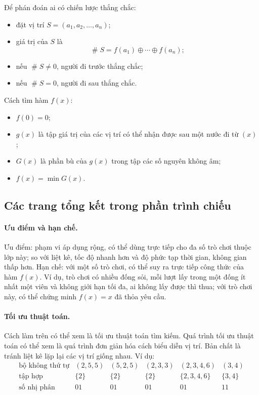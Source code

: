 \documentclass[11pt]{article}
\newcommand{\nimadd}{\oplus}
\newcommand{\val}[1]{\mathop{\#}\!#1}
\begin{document}
Để phán đoán ai có chiến lược thắng chắc:
\begin{itemize}
  \item đặt vị trí \(S=(a_1,a_2,\ldots,a_n)\);
  \item giá trị của \(S\) là
  \[
    \val{S}=f(a_1)\nimadd\cdots\nimadd f(a_n);
  \]
  \item nếu \(\val{S}\ne0\), người đi trước thắng chắc;
  \item nếu \(\val{S}=0\), người đi sau thắng chắc.
\end{itemize}
Cách tìm hàm \(f(x)\):
\begin{itemize}
  \item \(f(0)=0\);
  \item \(g(x)\) là tập giá trị của các vị trí có thể nhận được sau một nước
  đi từ \((x)\);
  \item \(G(x)\) là phần bù của \(g(x)\) trong tập các số nguyên không âm;
  \item \(f(x)=\min G(x)\).
\end{itemize}

\subsection{Các trang tổng kết trong phần trình chiếu}

\paragraph{Ưu điểm và hạn chế.}
Ưu điểm: phạm vi áp dụng rộng, có thể dùng trực tiếp cho đa số trò chơi thuộc
lớp này; so với liệt kê, tốc độ nhanh hơn và độ phức tạp thời gian, không
gian thấp hơn. Hạn chế: với một số trò chơi, có thể suy ra trực tiếp công
thức của hàm \(f(x)\). Ví dụ, trò chơi có nhiều đống sỏi, mỗi lượt lấy trong
một đống ít nhất một viên và không giới hạn tối đa, ai không lấy được thì
thua; với trò chơi này, có thể chứng minh \(f(x)=x\) đã thỏa yêu cầu.

\paragraph{Tối ưu thuật toán.}
Cách làm trên có thể xem là tối ưu thuật toán tìm kiếm. Quá trình tối ưu
thuật toán có thể xem là quá trình đơn giản hóa cách biểu diễn vị trí. Bản
chất là tránh liệt kê lặp lại các vị trí giống nhau. Ví dụ:
\[
\begin{array}{c|ccccc}
\text{bộ không thứ tự}
&(2,5,5)&(5,2,5)&(2,3,3)&(2,3,4,6)&(3,4)\\ \hline
\text{tập hợp}
&\{2\}&\{2\}&\{2\}&\{2,3,4,6\}&\{3,4\}\\ \hline
\text{số nhị phân}
&01&01&01&01&11
\end{array}
\]
\end{document}
